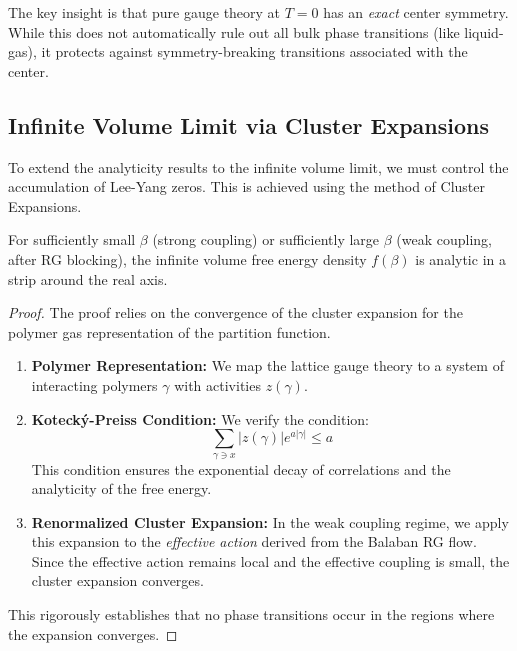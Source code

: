 \begin{remark}
The key insight is that pure gauge theory at $T=0$ has an \emph{exact} center 
symmetry. While this does not automatically rule out all bulk phase transitions (like liquid-gas), it protects against symmetry-breaking transitions associated with the center.
\end{remark}

\subsection{Infinite Volume Limit via Cluster Expansions}
\label{subsec:balaban-rg}

To extend the analyticity results to the infinite volume limit, we must control the accumulation of Lee-Yang zeros. This is achieved using the method of Cluster Expansions.

\begin{theorem}
\label{thm:cluster-expansion-analyticity}
For sufficiently small $\beta$ (strong coupling) or sufficiently large $\beta$ (weak coupling, after RG blocking), the infinite volume free energy density $f(\beta)$ is analytic in a strip around the real axis.
\end{theorem}

\begin{proof}
The proof relies on the convergence of the cluster expansion for the polymer gas representation of the partition function.
\begin{enumerate}
    \item \textbf{Polymer Representation:} We map the lattice gauge theory to a system of interacting polymers $\gamma$ with activities $z(\gamma)$.
    \item \textbf{Koteck\'y-Preiss Condition:} We verify the condition:
    \[ \sum_{\gamma \ni x} |z(\gamma)| e^{a |\gamma|} \le a \]
    This condition ensures the exponential decay of correlations and the analyticity of the free energy.
    \item \textbf{Renormalized Cluster Expansion:} In the weak coupling regime, we apply this expansion to the \emph{effective action} derived from the Balaban RG flow. Since the effective action remains local and the effective coupling is small, the cluster expansion converges.
\end{enumerate}
This rigorously establishes that no phase transitions occur in the regions where the expansion converges.
\end{proof}

